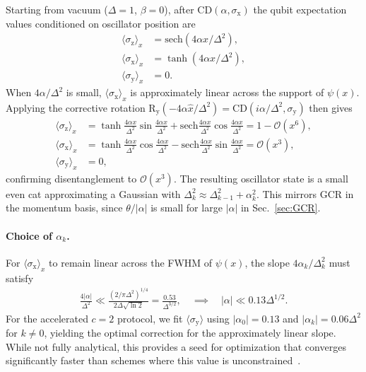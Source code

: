 \documentclass[aps,prx,showpacs,notitlepage,twocolumn,superscriptaddress,nofootinbib,preprintnumbers,floatfix,10pt, longbibliography]{revtex4-2}
\begin{document}
{Starting from vacuum ($\Delta=1$, $\beta=0$), after
$\mathrm{CD}(\alpha,\sigma_\mathrm{x})$ the qubit expectation values
conditioned on oscillator position are
\begin{align}
  \langle\sigma_\mathrm{z}\rangle_x &= \mathrm{sech}(4\alpha x/\Delta^2),\\
  \langle\sigma_\mathrm{x}\rangle_x &= \tanh(4\alpha x/\Delta^2),\\
  \langle\sigma_\mathrm{y}\rangle_x &= 0.
\end{align}
When $4\alpha/\Delta^2$ is small, $\langle\sigma_\mathrm{x}\rangle_x$
is approximately linear across the support of $\psi(x)$.  Applying the
corrective rotation $\mathrm{R}_\mathrm{y}(-4\alpha\hat{x}/\Delta^2)
=\mathrm{CD}(i\alpha/\Delta^2,\sigma_\mathrm{y})$ then gives
\begin{align}
  \langle\sigma_\mathrm{z}\rangle_x
    &= \tanh\!\tfrac{4\alpha x}{\Delta^2}\sin\!\tfrac{4\alpha x}{\Delta^2}
      +\mathrm{sech}\!\tfrac{4\alpha x}{\Delta^2}\cos\!\tfrac{4\alpha x}{\Delta^2}
     = 1-\mathcal{O}(x^6),\\
  \langle\sigma_\mathrm{x}\rangle_x
    &= \tanh\!\tfrac{4\alpha x}{\Delta^2}\cos\!\tfrac{4\alpha x}{\Delta^2}
      -\mathrm{sech}\!\tfrac{4\alpha x}{\Delta^2}\sin\!\tfrac{4\alpha x}{\Delta^2}
     = \mathcal{O}(x^3),\label{eq:new_sx}\\
  \langle\sigma_\mathrm{y}\rangle_x &= 0,
\end{align}
confirming disentanglement to $\mathcal{O}(x^3)$.  The resulting oscillator
state is a small even cat approximating a Gaussian with
$\Delta_k^2\approx\Delta_{k-1}^2+\alpha_k^2$.  This mirrors GCR in the
momentum basis, since $\theta/|\alpha|$ is small for large $|\alpha|$ in
Sec.~\ref{sec:GCR}.

\paragraph{Choice of $\alpha_k$.}
For $\langle\sigma_\mathrm{x}\rangle_x$ to remain linear across the FWHM
of $\psi(x)$, the slope $4\alpha_k/\Delta_k^2$ must satisfy
\begin{align}
  \frac{4|\alpha|}{\Delta^2}
  \ll \frac{(2/\pi\Delta^2)^{1/4}}{2\Delta\sqrt{\ln 2}}
  = \frac{0.53}{\Delta^{3/2}},
  \quad\implies\quad |\alpha| \ll 0.13\Delta^{1/2}.
\end{align}
For the accelerated $c=2$ protocol, we fit $\langle\sigma_\mathrm{y}\rangle$
using $|\alpha_0|=0.13$ and $|\alpha_k|=0.06\Delta^2$ for $k\neq 0$,
yielding the optimal correction for the approximately linear slope.  While
not fully analytical, this provides a seed for optimization that converges
significantly faster than schemes where this value is
unconstrained~\cite{hastrup2021unconditional}.

}
\end{document}
